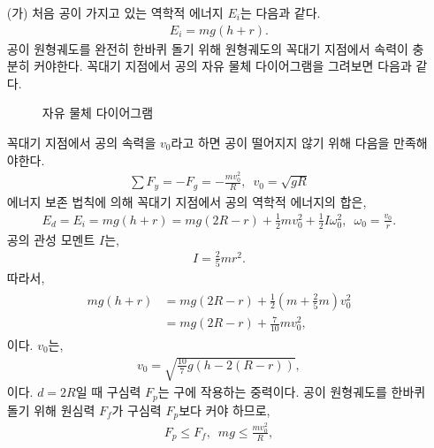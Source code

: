 \documentclass[floatfix,nofootinbib,superscriptaddress,fleqn]{revtex4-2}
\begin{document}
\begin{itemize}
  \item[(가)] 처음 공이 가지고 있는 역학적 에너지 $E_i$는 다음과 같다.
  \begin{align}
    E_i = mg(h+r).
  \end{align}
  공이 원형궤도를 완전히 한바퀴 돌기 위해 원형궤도의 꼭대기 지점에서 속력이 충분히
  커야한다. 꼭대기 지점에서 공의 자유 물체 다이어그램을 그려보면 다음과 같다.

  \begin{figure}[htp]
    \centering
    \caption{자유 물체 다이어그램}
    \label{fig:11}
  \end{figure}
  꼭대기 지점에서 공의 속력을 $v_0$라고 하면 공이 떨어지지 않기 위해 다음을 만족해야한다.
  \begin{align}
    \sum F_y = -F_g = -\frac{mv_0^2}{R},\,\,\,v_0 = \sqrt{gR}
  \end{align}
  에너지 보존 법칙에 의해 꼭대기 지점에서 공의 역학적 에너지의 합은,
  \begin{align}
    E_d = E_i = mg(h+r) = mg(2R-r) + \frac{1}{2}mv_0^2+\frac{1}{2}
    I\omega_0^2,\,\,\,\omega_0 = \frac{v_0}{r}.
  \end{align}
  공의 관성 모멘트 $I$는,
  \begin{align}
    I = \frac{2}{5}mr^2.
  \end{align}
  따라서,
  \begin{align}
    \begin{split}
      mg(h+r) &= mg(2R-r) + \frac{1}{2}\left(m+\frac{2}{5}m\right)v_0^2   \\
              &= mg(2R-r) + \frac{7}{10}mv_0^2,
    \end{split}
  \end{align}
  이다. $v_0$는,
  \begin{align}\label{eq:4-1}
    v_0 = \sqrt{\frac{10}{7}g(h-2(R-r))},
  \end{align}
  이다. $d=2R$일 때 구심력 $F_p$는 구에 작용하는 중력이다. 공이 원형궤도를 한바퀴 
  돌기 위해 원심력 $F_f$가 구심력 $F_p$보다 커야 하므로,
  \begin{align}
    F_p\leq F_f,\,\,\,mg\leq \frac{mv^2_0}{R},

\end{align}
\end{itemize}
\end{document}
